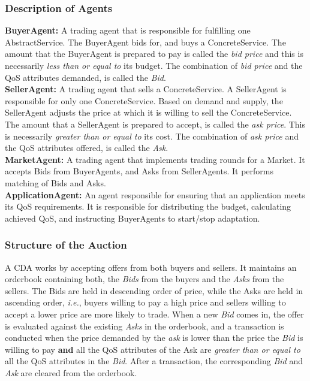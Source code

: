\documentclass[10pt,journal,compsoc]{IEEEtran}
\begin{document}
\subsubsection{Description of Agents}
\textbf{BuyerAgent:} A trading agent that is responsible for fulfilling one AbstractService. The BuyerAgent bids for, and buys a ConcreteService. The amount that the BuyerAgent is prepared to pay is called the \textsl{bid price} and this is necessarily \textit{less than or equal to} its budget. The combination of \textsl{bid price}  and the QoS attributes demanded, is called the \textsl{Bid}.\\
\textbf{SellerAgent:} A trading agent that sells a ConcreteService. A SellerAgent is responsible for only one ConcreteService. Based on demand and supply, the SellerAgent adjusts the price at which it is willing to sell the ConcreteService. The amount that a SellerAgent is prepared to accept, is called the \textsl{ask price}. This is necessarily \textit{greater than or equal to } its cost. The combination of \textsl{ask price} and the QoS attributes offered, is called the \textsl{Ask}.\\
\textbf{MarketAgent:} A trading agent that implements trading rounds for a Market. It accepts Bids from BuyerAgents, and Asks from SellerAgents. It performs matching of Bids and Asks.\\
\textbf{ApplicationAgent:} An agent responsible for ensuring that an application meets its QoS requirements. It is responsible for distributing the budget, calculating achieved QoS, and instructing BuyerAgents to start/stop adaptation.

\subsubsection{Structure of the Auction}
A CDA works by accepting offers from both buyers and sellers. It maintains an orderbook containing both, the \textsl{Bids} from the buyers and the \textsl{Asks} from the sellers. The Bids are held in descending order of price, while the Asks are held in ascending order, \textit{i.e.}, buyers willing to pay a high price and sellers willing to accept a lower price are more likely to trade. When a new \textit{Bid} comes in, the offer is evaluated against the existing \textit{Asks} in the orderbook, and a transaction is conducted when the price demanded by the \textit{ask} is lower than the price the \textit{Bid} is willing to pay \textbf{and} all the QoS attributes of the Ask are \textit{greater than or equal to} all the QoS attributes in the \textit{Bid}. After a transaction, the corresponding \textit{Bid} and \textit{Ask} are cleared from the orderbook.
\end{document}
